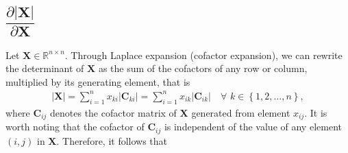 \documentclass{article}
\newcommand\abs[1]{\left\lvert#1\right\rvert}
\begin{document}
\subsection{\(\dfrac{\partial \abs{\mathbf{X}}}{\partial \mathbf{X}}\)}
Let \(\mathbf{X} \in \mathbb{R}^{n\times n}\). Through Laplace expansion (cofactor expansion), we can rewrite the determinant of \(\mathbf{X}\) as the sum of the cofactors of any row or column, multiplied by its generating element, that is
\begin{align}
    \abs{\mathbf{X}} = \sum_{i = 1}^{n} x_{ki} \abs{\mathbf{C}_{ki}} = \sum_{i = 1}^{n} x_{ik} \abs{\mathbf{C}_{ik}} \,\,\,\,\,\, \forall \,\, k \in \left\{ 1, 2, ..., n \right\},
\end{align}
where \(\mathbf{C}_{ij}\) denotes the cofactor matrix of \(\mathbf{X}\) generated from element \(x_{ij}\). It is worth noting that the cofactor of \(\mathbf{C}_{ij}\) is independent of the value of any element \((i,j)\) in \(\mathbf{X}\). Therefore, it follows that
\end{document}

